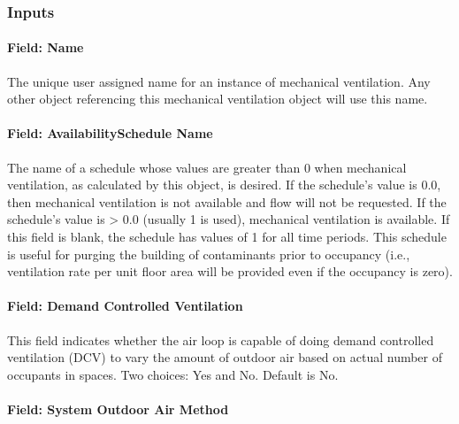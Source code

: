 \subsubsection{Inputs}\label{inputs-2-007}

\paragraph{Field: Name}\label{field-name-2-006}

The unique user assigned name for an instance of mechanical ventilation. Any other object referencing this mechanical ventilation object will use this name.

\paragraph{Field: AvailabilitySchedule Name}\label{field-availabilityschedule-name}

The name of a schedule whose values are greater than 0 when mechanical ventilation, as calculated by this object, is desired. If the schedule's value is 0.0, then mechanical ventilation is not available and flow will not be requested. If the schedule's value is \textgreater{} 0.0 (usually 1 is used), mechanical ventilation is available. If this field is blank, the schedule has values of 1 for all time periods. This schedule is useful for purging the building of contaminants prior to occupancy (i.e., ventilation rate per unit floor area will be provided even if the occupancy is zero).

\paragraph{Field: Demand Controlled Ventilation}\label{field-demand-controlled-ventilation}

This field indicates whether the air loop is capable of doing demand controlled ventilation (DCV) to vary the amount of outdoor air based on actual number of occupants in spaces. Two choices: Yes and No. Default is No.

\paragraph{Field: System Outdoor Air Method}\label{field-system-outdoor-air-method}

